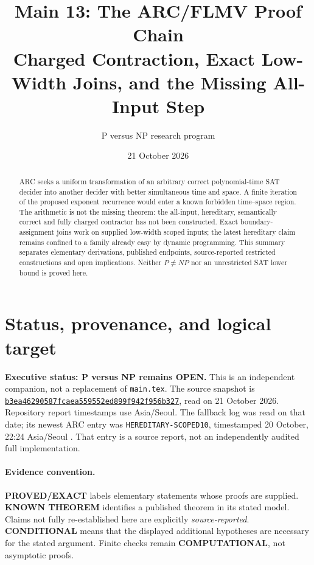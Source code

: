 \documentclass[11pt]{article}
\title{Main 13: The ARC/FLMV Proof Chain\\
\large Charged Contraction, Exact Low-Width Joins, and the Missing All-Input Step}
\author{P versus NP research program}
\date{21 October 2026}
\newcommand{\COND}{\textbf{CONDITIONAL}}
\newcommand{\EXACT}{\textbf{PROVED/EXACT}}
\newcommand{\KNOWN}{\textbf{KNOWN THEOREM}}
\begin{document}
\maketitle
\begin{abstract}
ARC seeks a uniform transformation of an arbitrary correct polynomial-time SAT
decider into another decider with better simultaneous time and space.
A finite iteration of the proposed exponent recurrence would enter a known
forbidden time--space region. The arithmetic is not the missing theorem:
the all-input, hereditary, semantically correct and fully charged contractor
has not been constructed. Exact boundary-assignment joins work on supplied
low-width scoped inputs; the latest hereditary claim remains confined to a
family already easy by dynamic programming. This summary separates elementary
derivations, published endpoints, source-reported restricted constructions
and open implications. Neither $P\ne NP$ nor an unrestricted SAT lower bound
is proved here.
\end{abstract}

\section{Status, provenance, and logical target}
\noindent\textbf{Executive status: P versus NP remains OPEN.}
This is an independent companion, not a replacement of \texttt{main.tex}.
The source snapshot is
\href{https://github.com/j15marti/pnp/tree/b3ea46290587fcaea559552ed899f942f956b327}
{\texttt{b3ea46290587fcaea559552ed899f942f956b327}}, read on
21 October 2026. Repository report timestamps use Asia/Seoul. The fallback
log was read on that date; its newest ARC entry was
\texttt{HEREDITARY-SCOPED10}, timestamped 20 October, 22:24 Asia/Seoul
\cite{fallback}. That entry is a source report, not an independently
audited full implementation.

\paragraph{Evidence convention.}
\EXACT{} labels elementary statements whose proofs are supplied.
\KNOWN{} identifies a published theorem in its stated model.
Claims not fully re-established here are explicitly \emph{source-reported}.
\COND{} means that the displayed additional hypotheses are necessary for the
stated argument. Finite checks remain \textbf{COMPUTATIONAL}, not asymptotic
proofs.
\end{document}
